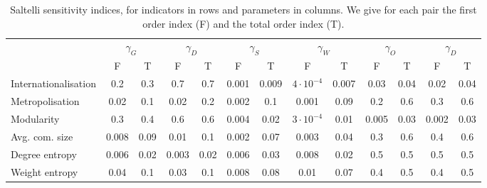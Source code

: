 \begin{table}
\begin{adjustwidth}{-2.25in}{0in}
\caption{Saltelli sensitivity indices, for indicators in rows and parameters in columns. We give for each pair the first order index (F) and the total order index (T).\label{tab:saltelli}}
\hspace{-1cm}\begin{tabular}{|l|c|c|c|c|c|c|c|c|c|c|c|c|}
\hline
 & \multicolumn{2}{|c|}{$\gamma_G$} & \multicolumn{2}{|c|}{$\gamma_D$} & \multicolumn{2}{|c|}{$\gamma_S$} & \multicolumn{2}{|c|}{$\gamma_W$} & \multicolumn{2}{|c|}{$\gamma_O$} & \multicolumn{2}{|c|}{$\gamma_D$} \\
 & F & T & F & T & F & T & F & T & F & T & F & T \\
 \hline
Internationalisation & 0.2 & 0.3 & 0.7 & 0.7 & 0.001 & 0.009 & $4\cdot 10^{-4}$ & 0.007 & 0.03 & 0.04 & 0.02 & 0.04 \\
Metropolisation & 0.02 & 0.1 & 0.02 & 0.2 & 0.002 & 0.1 & 0.001 & 0.09 & 0.2 & 0.6 & 0.3 & 0.6 \\
Modularity & 0.3 & 0.4 & 0.6 & 0.6 & 0.004 & 0.02 & $3\cdot 10^{-4}$ & 0.01 & 0.005 & 0.03 & 0.002 & 0.03 \\
Avg. com. size & 0.008 & 0.09 & 0.01 & 0.1 & 0.002 & 0.07 & 0.003 & 0.04 & 0.3 & 0.6 & 0.4 & 0.6 \\
Degree entropy & 0.006 & 0.02 & 0.003 & 0.02 & 0.006 & 0.03 & 0.008 & 0.02 & 0.5 & 0.5 & 0.5 & 0.5 \\
Weight entropy & 0.04 & 0.1 & 0.03 & 0.1 & 0.008 & 0.08 & 0.01 & 0.07 & 0.4 & 0.5 & 0.4 & 0.5 \\\hline
\end{tabular}
\end{adjustwidth}
\end{table}





